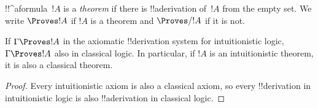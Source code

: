 \documentclass[../../../include/open-logic-section]{subfiles}
\begin{document}
\begin{defn}[Theorems]
!!^a{formula}~$!A$ is a \emph{theorem} if there is !!a{derivation}
of~$!A$ from the empty set.  We write $\Proves !A$ if $!A$ is a
theorem and $\Proves/ !A$ if it is not.
\end{defn}

\begin{prop}
  If $\Gamma \Proves !A$ in the axiomatic !!{derivation} system for
  intuitionistic logic, $\Gamma \Proves !A$ also in
  classical logic. In particular, if $!A$ is an intuitionistic
  theorem, it is also a classical theorem.
\end{prop}

\begin{proof}
  Every intuitionistic axiom is also a classical axiom, so every
  !!{derivation} in intuitionistic logic is also !!a{derivation} in
  classical logic.
\end{proof}
\end{document}
